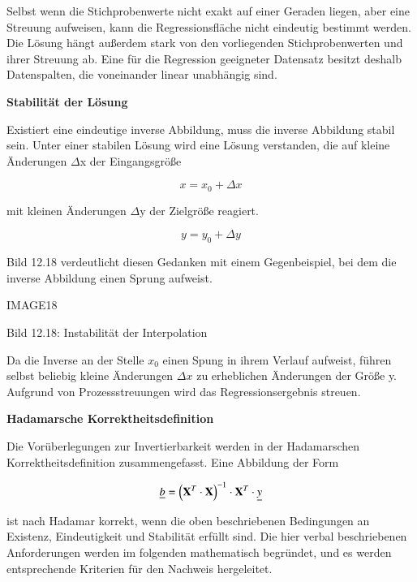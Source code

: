 \noindent Selbst wenn die Stichprobenwerte nicht exakt auf einer Geraden liegen, aber eine Streuung aufweisen, kann die Regressionsfl\"{a}che nicht eindeutig bestimmt werden. Die L\"{o}sung h\"{a}ngt au{\ss}erdem stark von den vorliegenden Stichprobenwerten und ihrer Streuung ab. Eine f\"{u}r die Regression geeigneter Datensatz besitzt deshalb Datenspalten, die voneinander linear unabh\"{a}ngig sind. \bigskip

\selectfont
\noindent\textbf{Stabilit\"{a}t der L\"{o}sung} \smallskip

\noindent Existiert eine eindeutige inverse Abbildung, muss die inverse Abbildung stabil sein. Unter einer stabilen L\"{o}sung wird eine L\"{o}sung verstanden, die auf kleine \"{A}nderungen $\Delta$x der Eingangsgr\"{o}{\ss}e 

\begin{equation}\label{eq:thirteenninetysix}
x=x_{0} +\Delta x
\end{equation}

\noindent mit kleinen \"{A}nderungen $\Delta$y der Zielgr\"{o}{\ss}e reagiert.

\begin{equation}\label{eq:thirteenninetyseven}
y=y_{0} +\Delta y
\end{equation}

\noindent Bild 12.18 verdeutlicht diesen Gedanken mit einem Gegenbeispiel, bei dem die inverse Abbildung einen Sprung aufweist.

IMAGE18

\noindent Bild 12.18: Instabilit\"{a}t der Interpolation

\noindent Da die Inverse an der Stelle $x_{0}$ einen Spung in ihrem Verlauf aufweist, f\"{u}hren selbst beliebig kleine \"{A}nderungen $\Delta x$ zu erheblichen \"{A}nderungen der Gr\"{o}{\ss}e y. Aufgrund von Prozessstreuungen wird das Regressionsergebnis streuen.\bigskip

\selectfont
\noindent\textbf{Hadamarsche Korrektheitsdefinition} \smallskip

\noindent Die Vor\"{u}berlegungen zur Invertierbarkeit werden in der Hadamarschen Korrektheitsdefinition zusammengefasst. Eine Abbildung der Form 

\begin{equation}\label{eq:thirteenninetyeight}
\underline{b}=\left(\mathbf{X}^{T} \cdot \mathbf{X}\right)^{-1} \cdot \mathbf{X}^{T} \cdot \underline{y}
\end{equation}

\noindent ist nach Hadamar korrekt, wenn die oben beschriebenen Bedingungen an Existenz, Eindeutigkeit und Stabilit\"{a}t erf\"{u}llt sind. Die hier verbal beschriebenen Anforderungen werden im folgenden mathematisch begr\"{u}ndet, und es werden entsprechende Kriterien f\"{u}r den Nachweis hergeleitet.

